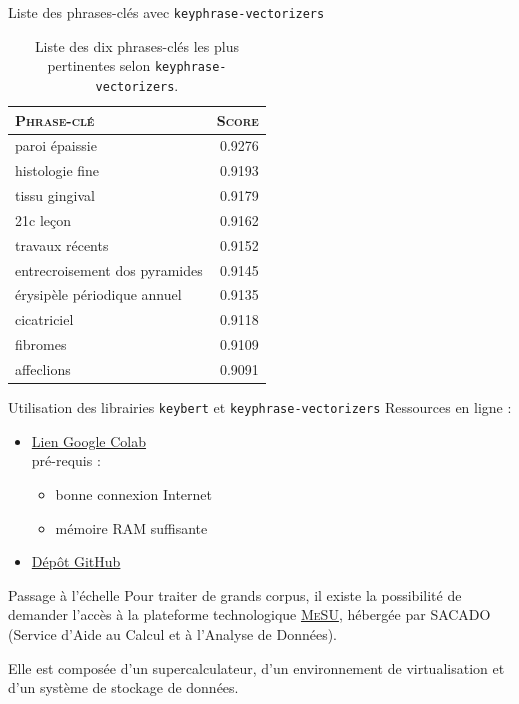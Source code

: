 \begin{frame}{Liste des phrases-clés avec \texttt{keyphrase-vectorizers}}
\begin{table}
\begin{tabular}{l|r}
\small
\rowcolor[HTML]{FFCCC9} 
\textsc{\textbf{Phrase-clé}} & \cellcolor[HTML]{DAE8FC}\textsc{\textbf{Score}} \\ \hline
paroi épaissie & 0.9276 \\
histologie fine & 0.9193 \\
tissu gingival & 0.9179 \\
21c leçon & 0.9162 \\
travaux récents & 0.9152 \\
entrecroisement dos pyramides & 0.9145 \\
érysipèle périodique annuel & 0.9135 \\
cicatriciel & 0.9118 \\
fibromes & 0.9109 \\
affeclions & 0.9091
\end{tabular}
\caption{Liste des dix phrases-clés les plus pertinentes selon \texttt{keyphrase-vectorizers}.}
\end{table}
\end{frame}

\begin{frame}{Utilisation des librairies \texttt{keybert} et \texttt{keyphrase-vectorizers}}
Ressources en ligne : \pause
\begin{itemize}[<+->]
\item \href{https://colab.research.google.com/drive/1sBJP-lJcKZPgIqWzFRNfrBn3domuy1tP?usp=sharing}{Lien Google Colab}\\
pré-requis :
\begin{itemize}[<+->]
\item bonne connexion Internet
\item mémoire RAM suffisante
\end{itemize}
\item \href{https://github.com/ljpetkovic/Charcot\_KeyBERT\_Keyphrase-Vectorizers?tab=readme-ov-file}{Dépôt GitHub}
\end{itemize}

\end{frame}

\begin{frame}{Passage à l'échelle}
Pour traiter de grands corpus, il existe la possibilité de demander l'accès à la plateforme technologique \href{https://sacado.sorbonne-universite.fr/}{\textsc{MeSU}}, hébergée par \textsc{SACADO} (Service d’Aide au Calcul et à l’Analyse de Données).\pause
\bigskip

Elle est composée d’un supercalculateur, d’un environnement de virtualisation et d’un système de stockage de données.
\end{frame}

